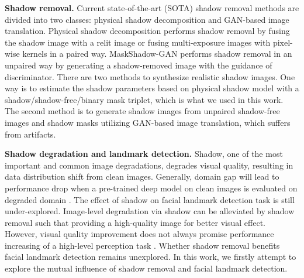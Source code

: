 \documentclass[10pt,twocolumn,letterpaper]{article}
\renewcommand{\paragraph}[1]{\vspace{1.25mm}\noindent\textbf{#1}}
\begin{document}
%
\paragraph{Shadow removal.} 
Current state-of-the-art (SOTA) shadow removal methods \cite{qu2017deshadownet,wang2018stacked, zhu2018bidirectional, le2019shadow,hu2019mask,fu2021auto} are divided into two classes: physical shadow decomposition and GAN-based image translation. Physical shadow decomposition performs shadow removal by fusing the shadow image with a relit image \cite{le2019shadow} or fusing multi-exposure images with pixel-wise kernels \cite{fu2021auto} in a paired way. MaskShadow-GAN \cite{hu2019mask} performs shadow removal in an unpaired way by generating a shadow-removed image with the guidance of discriminator. There are two methods to synthesize realistic shadow images. One way \cite{inoue2020learning, zhang2020portrait} is to estimate the shadow parameters based on physical shadow model \cite{shor2008the} with a shadow/shadow-free/binary mask triplet, which is what we used in this work.
The second method \cite{hu2019mask} is to generate shadow images from unpaired shadow-free images and shadow masks utilizing GAN-based image translation, which suffers from artifacts. 
%

\paragraph{Shadow degradation and landmark detection.}
Shadow, one of the most important and common image degradations, degrades visual quality, resulting in data distribution shift from clean images. Generally, domain gap will lead to performance drop when a pre-trained deep model on clean images is evaluated on degraded domain \cite{sun2018feature,fu2021let}. The effect of shadow on facial landmark detection task is still under-explored. Image-level degradation via shadow can be alleviated by shadow removal such that providing a high-quality image for better visual effect. 
However, visual quality improvement does not always promise performance increasing of a high-level perception task \cite{pei2019effects,hnewa2020object,fu2021let}. Whether shadow removal benefits facial landmark detection remains unexplored. In this work, we firstly attempt to explore the mutual influence of shadow removal and facial landmark detection.
\end{document}
